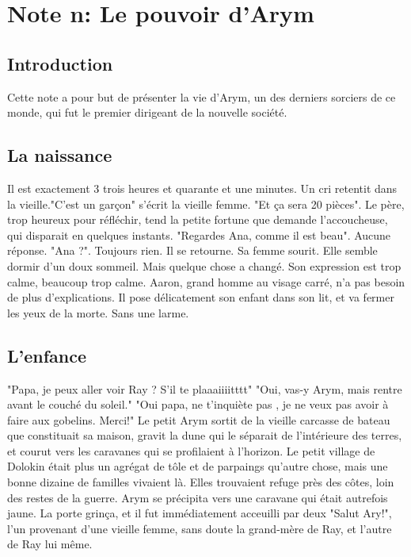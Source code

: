 \section{Note n: Le pouvoir d'Arym}
\subsection{Introduction}
Cette note a pour but de présenter la vie d'Arym, un des derniers sorciers de ce monde, qui fut le premier dirigeant de la nouvelle société.
\subsection{La naissance}
Il est exactement 3 trois heures et quarante et une minutes. Un cri retentit dans la vieille."C'est un garçon" s'écrit la vieille femme. "Et ça sera 20 pièces". Le père, trop heureux pour réfléchir, tend la petite fortune que demande l'accoucheuse, qui disparait en quelques instants.
\newline
"Regardes Ana, comme il est beau". Aucune réponse. "Ana ?". Toujours rien. Il se retourne. Sa femme sourit. Elle semble dormir d'un doux sommeil. Mais quelque chose a changé. Son expression est trop calme, beaucoup trop calme. Aaron, grand homme au visage carré, n'a pas besoin de plus d'explications. Il pose délicatement son enfant dans son lit, et va fermer les yeux de la morte. Sans une larme.
\subsection{L'enfance}
"Papa, je peux aller voir Ray ? S'il te plaaaiiiitttt"
\newline
"Oui, vas-y Arym, mais rentre avant le couché du soleil."
\newline
"Oui papa, ne t'inquiète pas , je ne veux pas avoir à faire aux gobelins. Merci!"
\newline
Le petit Arym sortit de la vieille carcasse de bateau que constituait sa maison, gravit la dune qui le séparait de l'intérieure des terres, et courut vers les caravanes qui se profilaient à l'horizon. Le petit village de Dolokin était plus un agrégat de tôle et de parpaings qu'autre chose, mais une bonne dizaine de familles vivaient là. Elles trouvaient refuge près des côtes, loin des restes de la guerre.
\newline
Arym se précipita vers une caravane qui était autrefois jaune. La porte grinça, et il fut immédiatement acceuilli par deux "Salut Ary!", l'un provenant d'une vieille femme, sans doute la grand-mère de Ray, et l'autre de Ray lui même. 
